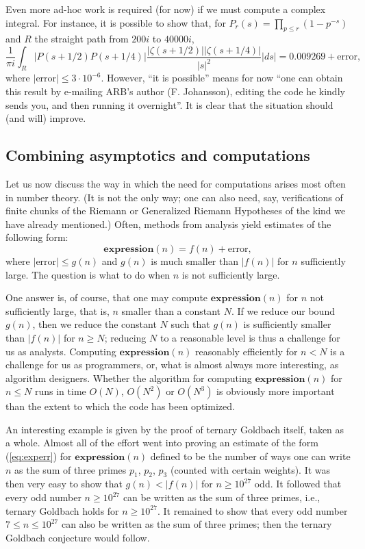Even more ad-hoc work is required (for now) if we must compute a complex integral. For instance,
it is possible to show that,
for $P_{r}(s) = \prod_{p\leq r} (1-p^{-s})$ and $R$ the straight path from
$200 i$ to $40000 i$,
\[\frac{1}{\pi i} \int_{R} |P(s+1/2) P(s+1/4)|
\frac{|\zeta(s+1/2)| |\zeta(s+1/4)|}{|s|^2} |d s| = 0.009269 + \text{error},\]
where $|\text{error}|\leq 3\cdot 10^{-6}$. However, ``it is possible'' means
for now ``one can obtain this result by e-mailing ARB's author
(F. Johansson), editing the code he kindly sends you, and then
running it overnight''. It is clear that the situation should (and will)
improve.

\subsection{Combining asymptotics and computations}

Let us now discuss the way in which
the need for computations arises most often in number
theory. (It is not the only way; one can also need, say, verifications of
finite chunks of the Riemann or Generalized Riemann Hypotheses of the kind we
have already mentioned.)
  Often, methods from analysis yield estimates of the following form:
  \begin{equation}\label{eq:experr}
    \textbf{expression}(n) = f(n) + \text{error},\end{equation}
  where $|\text{error}|\leq g(n)$ and $g(n)$ is much smaller than $|f(n)|$
  for $n$ sufficiently large. The question is what to do when $n$ is not
  sufficiently large.

  One answer is, of course, that one may compute $\textbf{expression}(n)$ for
  $n$ not sufficiently large, that is, $n$ smaller than a constant $N$.
  If we reduce our bound $g(n)$, then we reduce the constant $N$ such that
  $g(n)$ is sufficiently smaller than $|f(n)|$ for $n\geq N$; reducing $N$
  to a reasonable level is thus a challenge for us as analysts.
  Computing $\textbf{expression}(n)$ reasonably efficiently for $n<N$ is
  a challenge for us as programmers, or, what is almost always more
  interesting,  as algorithm designers. Whether the algorithm 
  for computing $\textbf{expression}(n)$ for $n\leq N$ runs in time
  $O(N)$, $O(N^2)$ or $O(N^3)$ is obviously more important than the extent
  to which the code has been optimized.

  An interesting example is given by the proof of ternary Goldbach itself, taken
  as a whole. Almost all of the effort went into proving an estimate
  of the form (\ref{eq:experr}) for $\textbf{expression}(n)$ defined
  to be the number of ways one can write $n$ as the sum of three primes
  $p_1$, $p_2$, $p_3$ (counted with certain weights). It was then very
  easy to show that $g(n)<|f(n)|$ for $n\geq 10^{27}$ odd. It followed
  that every odd number $n\geq 10^{27}$ can be written as the
  sum of three primes, i.e., ternary Goldbach holds for $n\geq 10^{27}$.
  It remained to show that every odd number $7\leq n\leq 10^{27}$ can also be
  written as the sum of three primes; then the ternary Goldbach conjecture
  would follow.

